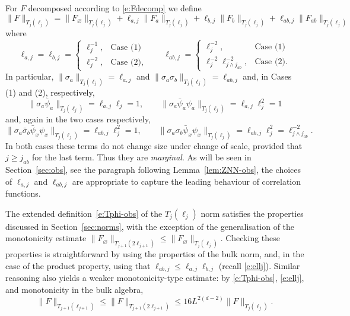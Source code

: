 \documentclass[11pt]{amsart}
\numberwithin{equation}{section}
\numberwithin{theorem}{section}
\newcommand{\1}{{\bf 1}}
\newcommand{\ellaj}{\ell_{a,j}}
\newcommand{\ellbj}{\ell_{b,j}}
\newcommand{\ellabj}{\ell_{ab,j}}
\begin{document}
For $F$ decomposed according to \eqref{e:Fdecomp} we define
\begin{equation} \label{e:Tphi-obs}
  \|F\|_{T_j(\ell_j)}
  = \|F_\varnothing\|_{T_j(\ell_j)}
  + \ellaj\|F_a\|_{T_j(\ell_j)}
  + \ellbj\|F_b\|_{T_j(\ell_j)}
  + \ellabj\|F_{ab}\|_{T_j(\ell_j)}
\end{equation}
where
\begin{equation} \label{e:ellsigma}
  \ellaj = \ellbj
  = \begin{cases}
    \ell_{j}^{-1}, & \text{Case (1)}\\
    \ell_j^{-2}, 
    & \text{Case (2)},
  \end{cases}
  \qquad
  \ellabj
  = \begin{cases}
    \ell_{j}^{-2}, & \text{Case (1)}\\
    \ell_j^{-2} \ell^{-2}_{j\wedge j_{ab}}, & \text{Case (2)}.
  \end{cases}
\end{equation}
In particular,
$\|\sigma_a\|_{T_j(\ell_j)} = \ellaj$ and $\|\sigma_a\sigma_b\|_{T_j(\ell_j)} = \ellabj$ and, in Cases (1) and (2), respectively,
\begin{equation} \label{e:a-marginal}
  \|\sigma_a\bar\psi_a\|_{T_j(\ell_j)}
  = \ellaj\ell_j = 1,
  \qquad
  \|\sigma_a\bar\psi_a\psi_a\|_{T_j(\ell_j)} = \ellaj\ell_j^2 =1 
\end{equation}
and, again in the two cases respectively, 
\begin{equation} \label{e:ab-marginal}
  \|\sigma_a{\bar \sigma_b}\bar\psi_x\psi_x\|_{T_j(\ell_j)} =
  \ellabj \ell_j^2 = 1, \qquad
  \|\sigma_a\sigma_b\bar\psi_x\psi_x\|_{T_j(\ell_j)} =
  \ellabj \ell_j^2 = \ell^{-2}_{j\wedge j_{ab}}.
\end{equation}
In both cases these terms do not change size under change of
scale, provided that $j\geq j_{ab}$ for the last term.
Thus they are \emph{marginal}.
As will be seen in Section~\ref{sec:obs}, see the paragraph
  following Lemma~\ref{lem:ZNN-obs}, the choices of $\ellaj$ and $\ellabj$
are appropriate to capture the leading behaviour of 
correlation functions.

The extended definition~\eqref{e:Tphi-obs} of the
$T_{j}(\ell_{j})$ norm satisfies the properties discussed in
Section~\ref{sec:norms}, with the exception of the generalisation of the monotonicity
estimate
$\|F_\varnothing\|_{T_{j+1}(2\ell_{j+1})} \leq
\|F_\varnothing\|_{T_{j}(\ell_{j})}$. Checking these properties
is straightforward by using the properties of the bulk norm, and, in
the case of the product property, using that
$\ell_{ab,j}\leq\ell_{a,j}\ell_{b,j}$ (recall \eqref{e:ellj}). Similar reasoning also
yields a weaker monotonicity-type estimate: by
\eqref{e:Tphi-obs}, \eqref{e:ellj}, and
monotonicity in the bulk algebra,
\begin{equation}
  \label{e:Tphi-obs-ub}
  \|F\|_{T_{j+1}(\ell_{j+1})}
  \leq \|F\|_{T_{j+1}(2\ell_{j+1})}
  \leq 16 L^{2(d-2)} \|F\|_{T_{j}(\ell_{j})} .
\end{equation}
\end{document}
